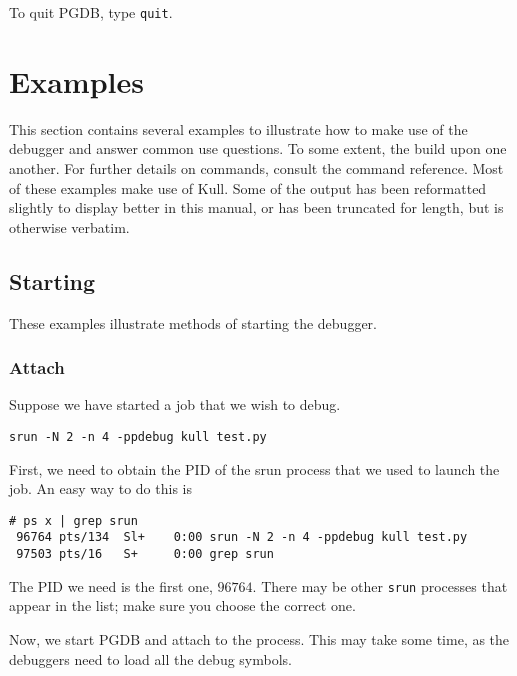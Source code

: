 \documentclass{refart}
\begin{document}
To quit PGDB, type \texttt{quit}.

\newpage

\section{Examples}

This section contains several examples to illustrate how to make use of the debugger and answer common use questions. To some extent, the build upon one another. For further details on commands, consult the command reference. Most of these examples make use of Kull. Some of the output has been reformatted slightly to display better in this manual, or has been truncated for length, but is otherwise verbatim.

\subsection{Starting}

These examples illustrate methods of starting the debugger.

\subsubsection{Attach}

Suppose we have started a job that we wish to debug.

\begin{Verbatim}
srun -N 2 -n 4 -ppdebug kull test.py
\end{Verbatim}

First, we need to obtain the PID of the srun process that we used to launch the job. An easy way to do this is

\begin{Verbatim}
# ps x | grep srun
 96764 pts/134  Sl+    0:00 srun -N 2 -n 4 -ppdebug kull test.py
 97503 pts/16   S+     0:00 grep srun
\end{Verbatim}

The PID we need is the first one, $96764$. There may be other \texttt{srun} processes that appear in the list; make sure you choose the correct one.

Now, we start PGDB and attach to the process. This may take some time, as the debuggers need to load all the debug symbols.
\end{document}
